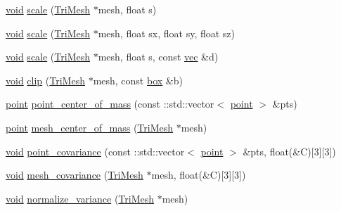 \begin{DoxyCompactItemize}
\item 
\hyperlink{namespacetrimesh_a784ddfd979e1c579bda795a8edfc3f43}{void} \hyperlink{namespacetrimesh_a7ab42ca91e0f6e2913219091b098fc4b}{scale} (\hyperlink{classtrimesh_1_1TriMesh}{Tri\+Mesh} $\ast$mesh, float s)
\item 
\hyperlink{namespacetrimesh_a784ddfd979e1c579bda795a8edfc3f43}{void} \hyperlink{namespacetrimesh_a9589dc160b5d9615c33a31cd6c68cd9d}{scale} (\hyperlink{classtrimesh_1_1TriMesh}{Tri\+Mesh} $\ast$mesh, float sx, float sy, float sz)
\item 
\hyperlink{namespacetrimesh_a784ddfd979e1c579bda795a8edfc3f43}{void} \hyperlink{namespacetrimesh_acfb0b9b5e4ca98a5a9f3a8d41d86d2ee}{scale} (\hyperlink{classtrimesh_1_1TriMesh}{Tri\+Mesh} $\ast$mesh, float s, const \hyperlink{namespacetrimesh_a4fc2b83feba99c931f837a0c7d4b4df1}{vec} \&d)
\item 
\hyperlink{namespacetrimesh_a784ddfd979e1c579bda795a8edfc3f43}{void} \hyperlink{namespacetrimesh_ad8b9f09b6441080d7e0eb7161574c11b}{clip} (\hyperlink{classtrimesh_1_1TriMesh}{Tri\+Mesh} $\ast$mesh, const \hyperlink{namespacetrimesh_aaa1e325da32038bae3d7e0a4d0b82595}{box} \&b)
\item 
\hyperlink{namespacetrimesh_a325b99fd6454b22fa4c4bc3223271b2c}{point} \hyperlink{namespacetrimesh_a93a754d2dc9fbf362b8ae136c7c818f0}{point\+\_\+center\+\_\+of\+\_\+mass} (const \+::std\+::vector$<$ \hyperlink{namespacetrimesh_a325b99fd6454b22fa4c4bc3223271b2c}{point} $>$ \&pts)
\item 
\hyperlink{namespacetrimesh_a325b99fd6454b22fa4c4bc3223271b2c}{point} \hyperlink{namespacetrimesh_aba568e2df505cabcca614749e6569e40}{mesh\+\_\+center\+\_\+of\+\_\+mass} (\hyperlink{classtrimesh_1_1TriMesh}{Tri\+Mesh} $\ast$mesh)
\item 
\hyperlink{namespacetrimesh_a784ddfd979e1c579bda795a8edfc3f43}{void} \hyperlink{namespacetrimesh_a96ebf4e1f7c1e0006873a4cd655d3342}{point\+\_\+covariance} (const \+::std\+::vector$<$ \hyperlink{namespacetrimesh_a325b99fd6454b22fa4c4bc3223271b2c}{point} $>$ \&pts, float(\&C)\mbox{[}3\mbox{]}\mbox{[}3\mbox{]})
\item 
\hyperlink{namespacetrimesh_a784ddfd979e1c579bda795a8edfc3f43}{void} \hyperlink{namespacetrimesh_ae859cdffd0660c404766403a241da53d}{mesh\+\_\+covariance} (\hyperlink{classtrimesh_1_1TriMesh}{Tri\+Mesh} $\ast$mesh, float(\&C)\mbox{[}3\mbox{]}\mbox{[}3\mbox{]})
\item 
\hyperlink{namespacetrimesh_a784ddfd979e1c579bda795a8edfc3f43}{void} \hyperlink{namespacetrimesh_a936db9eacc51c469bf2200b49b078356}{normalize\+\_\+variance} (\hyperlink{classtrimesh_1_1TriMesh}{Tri\+Mesh} $\ast$mesh)

\end{DoxyCompactItemize}
